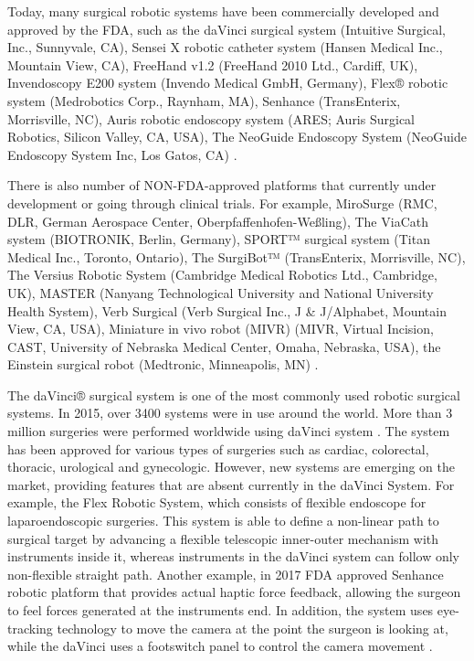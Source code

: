 Today, many surgical robotic systems have been commercially developed and approved by the FDA, such as the daVinci surgical system (Intuitive Surgical, Inc., Sunnyvale, CA), Sensei X robotic catheter system (Hansen Medical Inc., Mountain View, CA), FreeHand v1.2 (FreeHand 2010 Ltd., Cardiff, UK), Invendoscopy E200 system (Invendo Medical GmbH, Germany), Flex® robotic system (Medrobotics Corp., Raynham, MA), Senhance (TransEnterix, Morrisville, NC), Auris robotic endoscopy system (ARES; Auris Surgical Robotics, Silicon Valley, CA, USA), The NeoGuide Endoscopy System (NeoGuide Endoscopy System Inc, Los Gatos, CA) \cite{lanfranco_robotic_2004,peters_review_2018}.

There is also number of NON-FDA-approved platforms that currently under development or going through clinical trials. For example, MiroSurge (RMC, DLR, German Aerospace Center, Oberpfaffenhofen-Weßling), The ViaCath system (BIOTRONIK, Berlin, Germany), SPORT™ surgical system (Titan Medical Inc., Toronto, Ontario), The SurgiBot™ (TransEnterix, Morrisville, NC), The Versius Robotic System (Cambridge Medical Robotics Ltd., Cambridge, UK), MASTER (Nanyang Technological University and National University Health System), Verb Surgical (Verb Surgical Inc., J \& J/Alphabet, Mountain View, CA, USA), Miniature in vivo robot (MIVR) (MIVR, Virtual Incision, CAST, University of Nebraska Medical Center, Omaha, Nebraska, USA), the Einstein surgical robot (Medtronic, Minneapolis, MN) \cite{peters_review_2018}.

The daVinci® surgical system is one of the most commonly used robotic surgical systems. In 2015, over 3400 systems were in use around the world. More than 3 million surgeries were performed worldwide using daVinci system \cite{_intuitive_2018}. The system has been approved for various types of surgeries such as cardiac, colorectal, thoracic, urological and gynecologic. However, new systems are emerging on the market, providing features that are absent currently in the daVinci System. For example, the Flex Robotic System, which consists of flexible endoscope for laparoendoscopic surgeries. This system is able to define a non-linear path to surgical target by advancing a flexible telescopic inner-outer mechanism with instruments inside it, whereas instruments in the daVinci system can follow only non-flexible straight path. Another example, in 2017 FDA approved Senhance robotic platform that provides actual haptic force feedback, allowing the surgeon to feel forces generated at the instruments end. In addition, the system uses eye-tracking technology to move the camera at the point the surgeon is looking at, while the daVinci uses a footswitch panel to control the camera movement \cite{peters_review_2018}.

